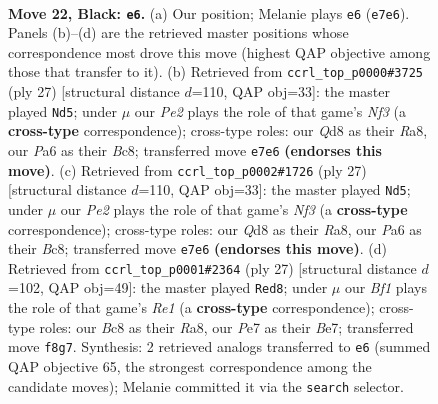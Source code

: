 \documentclass[11pt]{article}
\begin{document}
\clearpage

\begin{figure}[p]\centering
\begin{subfigure}{0.46\textwidth}\centering
\resizebox{\linewidth}{!}{%
\newchessgame
\chessboard[
  setfen={2bqrb1k/rp1ppp1p/p2n4/3Q4/P1PP2B1/2N2N2/1P3P1P/R1B2RK1 b - - 2 22},
  showmover=false,
  pgfstyle=straightmove, color=movearrow, markmove={e7-e6}
]}
\caption{}
\end{subfigure}\hfill
\begin{subfigure}{0.46\textwidth}\centering
\resizebox{\linewidth}{!}{%
\newchessgame
\chessboard[
  setfen={r1b2rk1/pp2qpp1/2n1pn1p/2b5/2Q3P1/2N2N2/PP1BPPBP/R4RK1 b - - 0 14},
  showmover=false,
  pgfstyle=straightmove, color=movearrow, markmove={f6-d5}
]}
\caption{}
\end{subfigure}
\\[4pt]
\begin{subfigure}{0.46\textwidth}\centering
\resizebox{\linewidth}{!}{%
\newchessgame
\chessboard[
  setfen={r1b2rk1/pp2qpp1/2n1pn1p/2b5/2Q3P1/2N2N2/PP1BPPBP/R4RK1 b - - 0 14},
  showmover=false,
  pgfstyle=straightmove, color=movearrow, markmove={f6-d5}
]}
\caption{}
\end{subfigure}\hfill
\begin{subfigure}{0.46\textwidth}\centering
\resizebox{\linewidth}{!}{%
\newchessgame
\chessboard[
  setfen={r3r1k1/ppq1bppp/2pp1n2/8/3QPB2/2N2P2/PPP3PP/3RR1K1 b - - 3 14},
  showmover=false,
  pgfstyle=straightmove, color=movearrow, markmove={e8-d8}
]}
\caption{}
\end{subfigure}
\caption{\textbf{Move 22, Black: \texttt{e6}.} (a) Our position; Melanie plays \texttt{e6} (\texttt{e7e6}). Panels (b)--(d) are the retrieved master positions whose correspondence most drove this move (highest QAP objective among those that transfer to it). (b) Retrieved from \texttt{ccrl\_top\_p0000\#3725} (ply 27) [structural distance $d$=110, QAP obj=33]: the master played \texttt{Nd5}; under $\mu$ our \emph{Pe2} plays the role of that game's \emph{Nf3} (a \textbf{cross-type} correspondence); cross-type roles: our \emph{Q}d8 as their \emph{R}a8, our \emph{P}a6 as their \emph{B}c8; transferred move \texttt{e7e6} \textbf{(endorses this move)}. (c) Retrieved from \texttt{ccrl\_top\_p0002\#1726} (ply 27) [structural distance $d$=110, QAP obj=33]: the master played \texttt{Nd5}; under $\mu$ our \emph{Pe2} plays the role of that game's \emph{Nf3} (a \textbf{cross-type} correspondence); cross-type roles: our \emph{Q}d8 as their \emph{R}a8, our \emph{P}a6 as their \emph{B}c8; transferred move \texttt{e7e6} \textbf{(endorses this move)}. (d) Retrieved from \texttt{ccrl\_top\_p0001\#2364} (ply 27) [structural distance $d$=102, QAP obj=49]: the master played \texttt{Red8}; under $\mu$ our \emph{Bf1} plays the role of that game's \emph{Re1} (a \textbf{cross-type} correspondence); cross-type roles: our \emph{B}c8 as their \emph{R}a8, our \emph{P}e7 as their \emph{B}e7; transferred move \texttt{f8g7}. Synthesis: 2 retrieved analogs transferred to \texttt{e6} (summed QAP objective 65, the strongest correspondence among the candidate moves); Melanie committed it via the \texttt{search} selector.}
\label{fig:thought-m43}
\end{figure}
\end{document}
